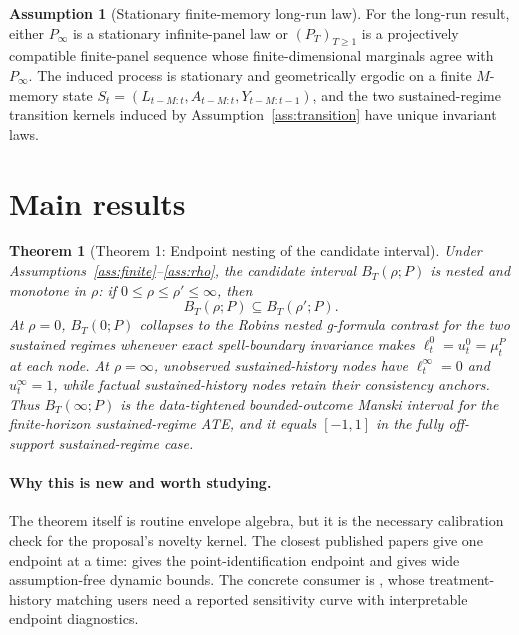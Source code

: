 \documentclass[11pt]{article}
\theoremstyle{definition}
\newtheorem{assumption}{Assumption}
\theoremstyle{plain}
\newtheorem{theorem}{Theorem}
\theoremstyle{remark}
\begin{document}
\begin{assumption}[Stationary finite-memory long-run law]\label{ass:stationary}
For the long-run result, either \(P_\infty\) is a stationary infinite-panel law
or \((P_T)_{T\ge1}\) is a projectively compatible finite-panel sequence whose
finite-dimensional marginals agree with \(P_\infty\).  The induced process is
stationary and geometrically ergodic on a finite \(M\)-memory state
\(S_t=(L_{t-M:t},A_{t-M:t},Y_{t-M:t-1})\), and the two sustained-regime
transition kernels induced by Assumption~\ref{ass:transition} have unique
invariant laws.
\end{assumption}

\section{Main results}
\begin{theorem}[Theorem 1: Endpoint nesting of the candidate interval]\label{thm:endpoints}
Under Assumptions~\ref{ass:finite}--\ref{ass:rho}, the candidate interval
\(B_T(\rho;P)\) is nested and monotone in \(\rho\): if
\(0\le\rho\le\rho'\le\infty\), then
\[
B_T(\rho;P)\subseteq B_T(\rho';P).
\]
At \(\rho=0\), \(B_T(0;P)\) collapses to the Robins nested g-formula contrast
for the two sustained regimes whenever exact spell-boundary invariance makes
\(\ell_t^0=u_t^0=\mu_t^P\) at each node.  At \(\rho=\infty\),
unobserved sustained-history nodes have \(\ell_t^\infty=0\) and
\(u_t^\infty=1\), while factual sustained-history nodes retain their
consistency anchors.  Thus \(B_T(\infty;P)\) is the data-tightened
bounded-outcome Manski interval for the finite-horizon sustained-regime ATE,
and it equals \([-1,1]\) in the fully off-support sustained-regime case.
\end{theorem}
\paragraph{Why this is new and worth studying.}
The theorem itself is routine envelope algebra, but it is the necessary
calibration check for the proposal's novelty kernel.  The closest published
papers give one endpoint at a time: \citet{Robins1986} gives the
point-identification endpoint and \citet{DiemerShiSwanson2024} gives wide
assumption-free dynamic bounds.  The concrete consumer is
\citet{ImaiKimWang2023}, whose treatment-history matching users need a
reported sensitivity curve with interpretable endpoint diagnostics.
\end{document}
